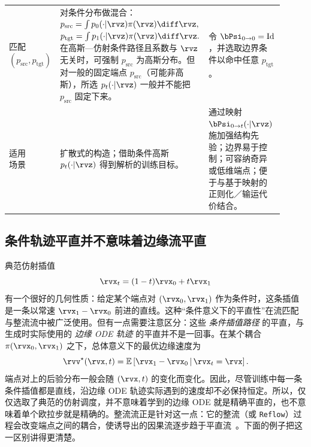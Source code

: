 \begin{table}[th!]
\begin{tabular}{p{0.13\linewidth} p{0.39\linewidth} p{0.39\linewidth}}
\graymidrule

\textbfs{匹配 \newline $(p_{\mathrm{src}},p_{\mathrm{tgt}})$}
&
对条件分布做混合：
\newline
\hspace{3cm}
$p_{\mathrm{src}}
=
\int p_0(\cdot|\rvz)\pi(\rvz)\diff\rvz,$
\newline
$p_{\mathrm{tgt}}
=
\int p_1(\cdot|\rvz)\pi(\rvz)\diff\rvz.$
\newline
在高斯—仿射条件路径且系数与 $\rvz$ 无关时，可强制 $p_{\mathrm{src}}$ 为高斯分布。但对一般的固定端点 $p_{\mathrm{src}}$（可能非高斯），所选 $p_t(\cdot|\rvz)$ 一般并不能把 $p_{\mathrm{src}}$ 固定下来。
&
令 $\bPsi_{0\to 0}=\mathrm{Id}$，并选取边界条件以命中任意
$p_{\mathrm{tgt}}$。
\\

\graymidrule

\textbfs{适用 \newline 场景}
&
扩散式的构造；借助条件高斯 $p_t(\cdot|\rvz)$ 得到解析的训练目标。
&
通过映射 $\bPsi_{0\to t}(\cdot|\rvz)$ 施加强结构先验；边界易于控制；可容纳奇异或低维端点；便于与基于映射的正则化／输运代价结合。
\\

\bottomrule
\end{tabular}
\endgroup
\end{table}


\subsection{条件轨迹平直并不意味着边缘流平直}

典范仿射插值
\[
\rvx_t
=
(1-t)\rvx_0+t\rvx_1
\]
有一个很好的几何性质：给定某个端点对 $(\rvx_0,\rvx_1)$ 作为条件时，这条插值是一条以常速 $\rvx_1-\rvx_0$ 前进的直线。这种“条件意义下的平直性”在流匹配与整流流中被广泛使用。但有一点需要注意区分：这些
\emph{条件插值路径} 的平直，与生成时实际使用的
\emph{边缘 ODE 轨迹} 的平直并不是一回事。在某个耦合 $\pi(\rvx_0,\rvx_1)$ 之下，总体意义下的最优边缘速度为
\[
\rvv^\star(\rvx,t)
=
\mathbb{E}
\left[
\rvx_1-\rvx_0
\,\middle|\,
\rvx_t=\rvx
\right].
\]
端点对上的后验分布一般会随 $(\rvx,t)$ 的变化而变化。因此，尽管训练中每一条条件插值都是直线，沿边缘 ODE 轨迹实际遇到的速度却不必保持恒定。所以，仅仅选取了典范的仿射调度，并不意味着学到的边缘 ODE 就是精确平直的，也不意味着单个欧拉步就是精确的。整流流正是针对这一点：它的整流（或 \texttt{Reflow}）过程会改变端点之间的耦合，使诱导出的因果流逐步趋于平直流~\citep{liu2022flow}。下面的例子把这一区别讲得更清楚。

